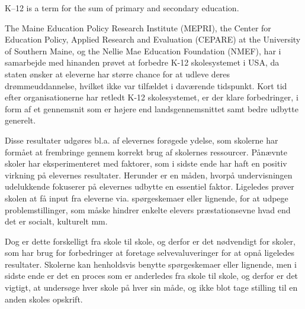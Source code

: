 K–12 is a term for the sum of primary and secondary education. 

The Maine Education Policy Research Institute (MEPRI), the Center for Education Policy, Applied Research and Evaluation (CEPARE) at the University of Southern Maine, og the Nellie Mae Education Foundation (NMEF), har i samarbejde med hinanden prøvet at forbedre K-12 skolesystemet i USA, da staten ønsker at eleverne har større chance for at udleve deres drømmeuddannelse, hvilket ikke var tilfældet i daværende tidspunkt. Kort tid efter organisationerne har retledt K-12 skolesystemet, er der klare forbedringer, i form af et gennemsnit som er højere end landsgennemsnittet samt bedre udbytte generelt. 

Disse resultater udgøres bl.a. af elevernes forøgede ydelse, som skolerne har formået at frembringe gennem korrekt brug af skolernes ressourcer. Pånævnte skoler har eksperimenteret med faktorer, som i sidste ende har haft en positiv virkning på elevernes resultater. Herunder er en måden, hvorpå undervisningen udelukkende fokuserer på elevernes udbytte en essentiel faktor. Ligeledes prøver skolen at få input fra eleverne via. spørgeskemaer eller lignende, for at udpege problemstillinger, som måske hindrer enkelte elevers præstationsevne hvad end det er socialt, kulturelt mm. 

Dog er dette forskelligt fra skole til skole, og derfor er det nødvendigt for skoler, som har brug for forbedringer at foretage selvevaluveringer for at opnå ligeledes resultater. Skolerne kan henholdsvis benytte spørgeskemaer eller lignende, men i sidste ende er det en proces som er anderledes fra skole til skole, og derfor er det vigtigt, at undersøge hver skole på hver sin måde, og ikke blot tage stilling til en anden skoles opskrift. 


